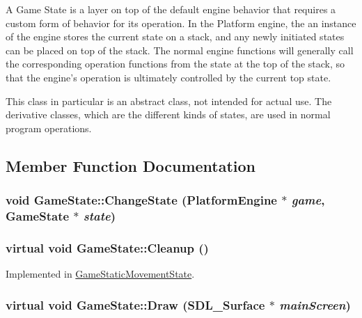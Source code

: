 A Game State is a layer on top of the default engine behavior that requires a custom form of behavior for its operation. In the Platform engine, the an instance of the engine stores the current state on a stack, and any newly initiated states can be placed on top of the stack. The normal engine functions will generally call the corresponding operation functions from the state at the top of the stack, so that the engine's operation is ultimately controlled by the current top state.

This class in particular is an abstract class, not intended for actual use. The derivative classes, which are the different kinds of states, are used in normal program operations. 

\subsection{Member Function Documentation}
\hypertarget{class_game_state_f786aeb704a22a135dc289bb89fcc452}{
\subsubsection[{ChangeState}]{\setlength{\rightskip}{0pt plus 5cm}void GameState::ChangeState ({\bf PlatformEngine} $\ast$ {\em game}, \/  {\bf GameState} $\ast$ {\em state})}}
\label{dd/d87/class_game_state_f786aeb704a22a135dc289bb89fcc452}


\hypertarget{class_game_state_041e7a5430d71da84745af11abdacd93}{
\subsubsection[{Cleanup}]{\setlength{\rightskip}{0pt plus 5cm}virtual void GameState::Cleanup ()}}
\label{dd/d87/class_game_state_041e7a5430d71da84745af11abdacd93}




Implemented in \hyperlink{class_game_static_movement_state_072662abaf5a872f7919e7fc44200a04}{GameStaticMovementState}.\hypertarget{class_game_state_1b93233932defca939eed4c0676a5d2a}{
\subsubsection[{Draw}]{\setlength{\rightskip}{0pt plus 5cm}virtual void GameState::Draw (SDL\_\-Surface $\ast$ {\em mainScreen})}}
\label{dd/d87/class_game_state_1b93233932defca939eed4c0676a5d2a}




